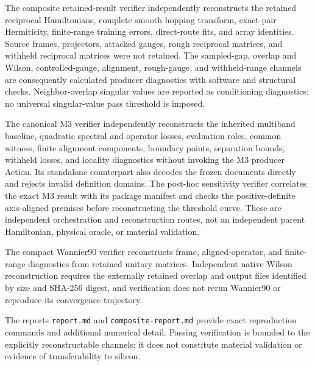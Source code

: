 The composite retained-result verifier independently reconstructs the retained
reciprocal Hamiltonians, complete smooth hopping transform, exact-pair Hermiticity,
finite-range training errors, direct-route fits, and array identities. Source frames,
projectors, attacked gauges, rough reciprocal matrices, and withheld reciprocal
matrices were not retained. The sampled-gap, overlap and Wilson, controlled-gauge,
alignment, rough-gauge, and withheld-range channels are consequently calculated
producer diagnostics with software and structural checks. Neighbor-overlap singular
values are reported as conditioning diagnostics; no universal singular-value pass
threshold is imposed.

The canonical M3 verifier independently reconstructs the inherited multiband
baseline, quadratic spectral and operator losses, evaluation roles, common
witness, finite alignment components, boundary points, separation bounds,
withheld losses, and locality diagnostics without invoking the M3 producer
Action. Its standalone counterpart also decodes the frozen documents directly
and rejects invalid definition domains. The post-hoc sensitivity verifier
correlates the exact M3 result with its package manifest and checks the
positive-definite axis-aligned premises before reconstructing the threshold
curve. These are independent orchestration and reconstruction routes, not an
independent parent Hamiltonian, physical oracle, or material validation.

The compact Wannier90 verifier reconstructs frame, aligned-operator, and finite-range
diagnostics from retained unitary matrices. Independent native Wilson reconstruction
requires the externally retained overlap and output files identified by size and
SHA-256 digest, and verification does not rerun Wannier90 or reproduce its convergence
trajectory.

The reports \texttt{report.md} and \texttt{composite-report.md} provide exact
reproduction commands and additional numerical detail. Passing verification is
bounded to the explicitly reconstructable channels; it does not constitute material
validation or evidence of transferability to silicon.
